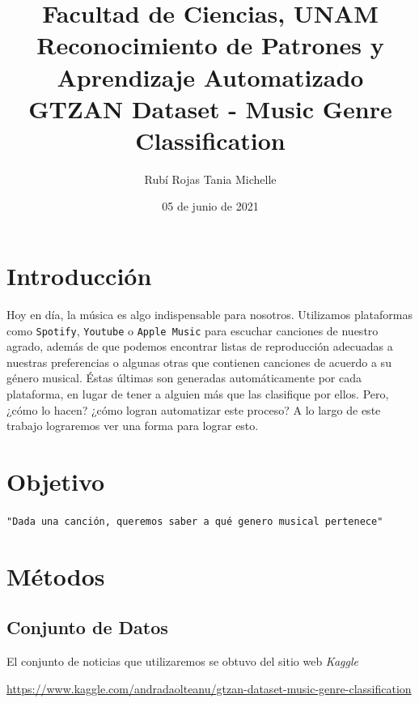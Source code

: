\documentclass[letterpaper,11pt]{article}
\title{Facultad de Ciencias, UNAM \\ 
       Reconocimiento de Patrones y Aprendizaje Automatizado \\ 
       GTZAN Dataset - Music Genre Classification}
\author{Rubí Rojas Tania Michelle}
\date{05 de junio de 2021}
\begin{document}
\maketitle

\section{Introducción}
Hoy en día, la música es algo indispensable para nosotros. Utilizamos 
plataformas como \texttt{Spotify}, \texttt{Youtube} o \texttt{Apple Music} 
para escuchar canciones de nuestro agrado, además de que podemos encontrar 
listas de reproducción adecuadas a nuestras preferencias o algunas otras que 
contienen canciones de acuerdo a su género musical. Éstas últimas son 
generadas automáticamente por cada plataforma, en lugar de tener a alguien 
más que las clasifique por ellos. Pero, ¿cómo lo hacen? ¿cómo logran 
automatizar este proceso? A lo largo de este trabajo lograremos ver una forma 
para lograr esto.

\section{Objetivo}
\begin{center}
    \texttt{"Dada una canción, queremos saber a qué genero musical pertenece"}
\end{center}

\section{Métodos}
\subsection{Conjunto de Datos}
El conjunto de noticias que utilizaremos se obtuvo del sitio web \textit{Kaggle}
\begin{center}
    \url{https://www.kaggle.com/andradaolteanu/gtzan-dataset-music-genre-classification}
\end{center}
\end{document}
